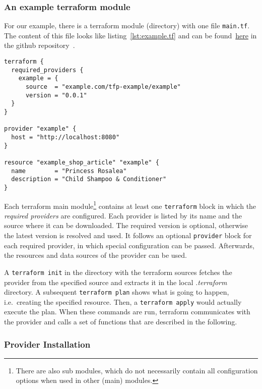 \documentclass[paper=a4,11pt,numbers=noenddot]{article}
\begin{document}
\subsubsection{An example terraform module}
\label{subsubsec:an-example-terraform}

For our example, there is a terraform module (directory) with one file \verb'main.tf'. The content of this file looks like listing~\ref{lst:example.tf} and can be found~\href{https://github.com/ecky-l/terraform-provider-example/blob/main/src/exampletf}{here} in the github repository~\autocite{ecky-l_terraform-provider-example_nodate}.

\begin{lstlisting}[label=lst:example.tf]
terraform {
  required_providers {
    example = {
      source  = "example.com/tfp-example/example"
      version = "0.0.1"
  }
}

provider "example" {
  host = "http://localhost:8080"
}

resource "example_shop_article" "example" {
  name        = "Princess Rosalea"
  description = "Child Shampoo & Conditioner"
}
\end{lstlisting}

Each terraform main module\footnote{There are also sub modules, which do not necessarily contain all configuration options when used in other (main) modules.} contains at least one \verb'terraform' block in which the \emph{required providers} are configured. Each provider is listed by its name and the source where it can be downloaded. The required version is optional, otherwise the latest version is resolved and used. It follows an optional \verb'provider' block for each required provider, in which special configuration can be passed. Afterwards, the resources and data sources of the provider can be used.

A \verb'terraform init' in the directory with the terraform sources fetches the provider from the specified source and extracts it in the local \emph{.terraform} directory. A subsequent \verb'terraform plan' shows what is going to happen, i.e.\ creating the specified resource. Then, a \verb'terraform apply' would actually execute the plan. When these commands are run, terraform communicates with the provider and calls a set of functions that are described in the following.


\subsubsection{Provider Installation}
\label{subsubsec:prov-inst}
\end{document}
